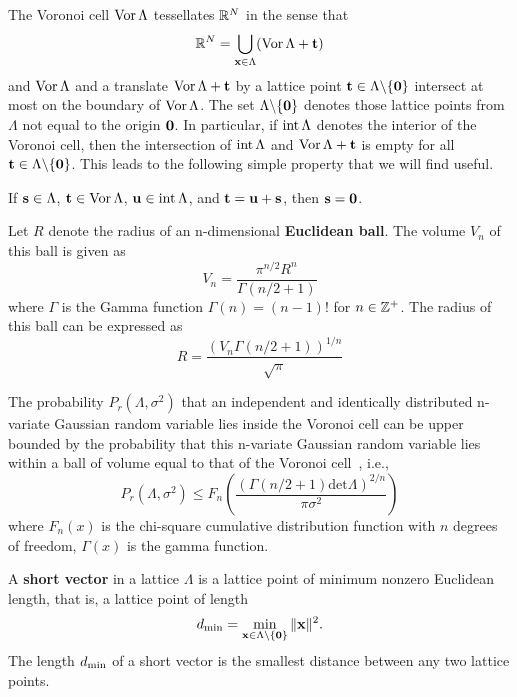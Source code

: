 The Voronoi cell $\operatorname{Vor}\Lambda$ tessellates ${\mathbb R}^N$ in the sense that
\[
{\mathbb R}^N = \bigcup_{\mathbf{x} \in \Lambda} (\operatorname{Vor}\Lambda + \mathbf{t})
\]
and $\operatorname{Vor}\Lambda$ and a translate $\operatorname{Vor}\Lambda + \mathbf{t}$ by a lattice point $\mathbf{t} \in \Lambda\backslash  \{\boldsymbol{0}\}$ intersect at most on the boundary of $\operatorname{Vor}\Lambda$.  The set $\Lambda \backslash  \{\boldsymbol{0}\}$ denotes those lattice points from $\Lambda$ not equal to the origin $\boldsymbol{0}$.  In particular, if $\operatorname{int}\Lambda$ denotes the interior of the Voronoi cell, then the intersection of $\operatorname{int}\Lambda$ and $\operatorname{Vor} \Lambda + \mathbf{t}$ is empty for all $\mathbf{t} \in \Lambda \backslash  \{\boldsymbol{0}\}$.  %
This leads to the following simple property that we will find useful.

\begin{remark}\label{remarksimpleintvor}
If $\mathbf{s} \in \Lambda$, $\mathbf{t} \in \operatorname{Vor}\Lambda$, $\mathbf{u} \in \operatorname{int}\Lambda$, and $\mathbf{t} = \mathbf{u} + \mathbf{s}$, then $\mathbf{s} = \boldsymbol{0}$.
\end{remark}


Let $R$ denote the radius of an n-dimensional \textbf{Euclidean ball}. The volume $V_n$ of this ball is given as
\[
V_n = \frac{\pi^{n/2}R^n}{\Gamma(n/2 + 1)} 
\]
where $\Gamma$ is the Gamma function $\Gamma(n)=(n-1)!$ for $n\in {\mathbb Z}^+$. The radius of this ball can be expressed as
\[
R =  \dfrac{\left (V_n \Gamma(n/2 + 1)\right)^{1/n}}{\sqrt{\pi}} 
\]

The probability $P_r(\Lambda, \sigma^2)$ that an independent and identically distributed n-variate Gaussian random variable lies inside the Voronoi cell can be upper bounded by the probability that this n-variate Gaussian random variable lies within a ball of volume equal to that of the Voronoi cell~\cite[Sec.~IV.C]{Hassibi_GPS_1998}, i.e.,
\begin{equation}\label{ch2:upperBoundUsingSphere}
P_r(\Lambda, \sigma^2) \leq F_n \left( \frac{ \left (  \Gamma(n/2 + 1)  \text{det}\Lambda  \right)^{2/n} } {\pi \sigma^2} \right)
\end{equation}
where $F_n(x)$ is the chi-square cumulative distribution function with $n$ degrees of freedom,  $\Gamma(x)$ is the gamma function.

A \textbf{short vector} in a lattice $\Lambda$ is a lattice point of minimum nonzero Euclidean length, that is, a lattice point of length
\[
d_{\text{min}} =  \min_{\mathbf{x} \in \Lambda \backslash \{ \boldsymbol{0} \} } \| \mathbf{x} \|^2.
\]   
The length $d_{\text{min}}$ of a short vector is the smallest distance between any two lattice points. 

